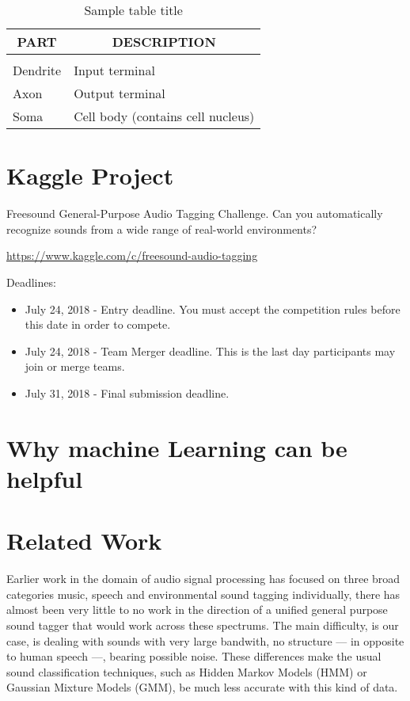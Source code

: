 \documentclass{article} %
\begin{document}
	\begin{table}[t]
	\caption{Sample table title}
	\label{sample-table}
	\begin{center}
	\begin{tabular}{ll}
	\multicolumn{1}{c}{\bf PART}  &\multicolumn{1}{c}{\bf DESCRIPTION}
	\\ \hline \\
	Dendrite         &Input terminal \\
	Axon             &Output terminal \\
	Soma             &Cell body (contains cell nucleus) \\
	\end{tabular}
	\end{center}
	\end{table}

\section{Kaggle Project}

	Freesound General-Purpose Audio Tagging Challenge. Can you automatically recognize sounds from a wide range of real-world environments?
	\begin{center}
	   \url{https://www.kaggle.com/c/freesound-audio-tagging}
	\end{center}
	Deadlines:
	\begin{itemize}
	    \item July 24, 2018 - Entry deadline. You must accept the competition rules before this date in order to compete.
	    \item July 24, 2018 - Team Merger deadline. This is the last day participants may join or merge teams.
	    \item July 31, 2018 - Final submission deadline.
	\end{itemize}

\section{Why machine Learning can be helpful}

\section{Related Work}
Earlier work in the domain of audio signal processing has focused on three broad categories music, speech and environmental sound tagging individually, there has almost been very little to no work in the direction of a unified general purpose sound tagger that would work across these spectrums.
The main difficulty, is our case, is dealing with sounds with very large bandwith, no structure --- in opposite to human speech ---, bearing possible noise. These differences make the usual sound classification techniques, such as Hidden Markov Models (HMM) or Gaussian Mixture Models (GMM), be much less accurate with this kind of data.
\end{document}
